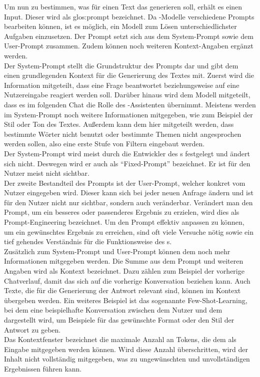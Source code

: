 \documentclass[../main.tex]{subfiles}
\begin{document}
Um nun zu bestimmen, was für einen Text das  generieren soll, erhält es einen Input. Dieser wird als \gls{glos:prompt} bezeichnet. Da -Modelle verschiedene Prompts bearbeiten können, ist es 
möglich, ein Modell zum Lösen unterschiedlichster Aufgaben einzusetzen. Der Prompt setzt sich aus dem System-Prompt sowie dem User-Prompt zusammen. Zudem können noch weiteren Kontext-Angaben 
ergänzt werden.\cite{systemprompt}\\
Der System-Prompt stellt die Grundstruktur des Prompts dar und gibt dem  einen grundlegenden Kontext für die Generierung des Textes mit. Zuerst wird die Information mitgeteilt, dass eine 
Frage beantwortet beziehungsweise auf eine Nutzereingabe reagiert werden soll. Darüber hinaus wird dem Modell mitgeteilt, dass es im folgenden Chat die Rolle des -Assistenten übernimmt. 
Meistens werden im System-Prompt noch weitere Informationen mitgegeben, wie zum Beispiel der Stil oder Ton des Textes. Außerdem kann dem  hier mitgeteilt werden, dass bestimmte Wörter 
nicht benutzt oder bestimmte Themen nicht angesprochen werden sollen, also eine erste Stufe von Filtern eingebaut werden.\cite{systemprompt}\\
Der System-Prompt wird meist durch die Entwickler des s festgelegt und ändert sich nicht. Deswegen wird er auch als "`Fixed-Prompt"' bezeichnet. Er ist für den Nutzer meist nicht sichtbar.\\
Der zweite Bestandteil des Prompts ist der User-Prompt, welcher konkret vom Nutzer eingegeben wird. Dieser kann sich bei jeder neuen Anfrage ändern und ist für den Nutzer nicht nur sichtbar, sondern 
auch veränderbar. Verändert man den Prompt, um ein besseres oder passenderes Ergebnis zu erzielen, wird dies als Prompt-Engineering bezeichnet. Um den Prompt effektiv anpassen zu können, um 
ein gewünschtes Ergebnis zu erreichen, sind oft viele Versuche nötig sowie ein tief gehendes Verständnis für die Funktionsweise des s.\cite{promptengineering}\\
Zusätzlich zum System-Prompt und User-Prompt können dem  noch mehr Informationen mitgegeben werden. Die Summe aus dem Prompt und weiteren Angaben wird als Kontext bezeichnet. Dazu zählen 
zum Beispiel der vorherige Chatverlauf, damit das  sich auf die vorherige Konversation beziehen kann. Auch Texte, die für die Generierung der Antwort relevant sind, können im Kontext 
übergeben werden. Ein weiteres Beispiel ist das sogenannte Few-Shot-Learning, bei dem eine  beispielhafte Konversation zwischen dem Nutzer und dem  dargestellt wird, um Beispiele für das 
gewünschte Format oder den Stil der Antwort zu geben.\cite{kontext,FewShot}\\
Das Kontextfenster bezeichnet die maximale Anzahl an Tokens, die dem  als Eingabe mitgegeben werden können. Wird diese Anzahl überschritten, wird der Inhalt nicht vollständig mitgegeben, 
was zu ungewünschten und unvollständigen Ergebnissen führen kann.
\end{document}
